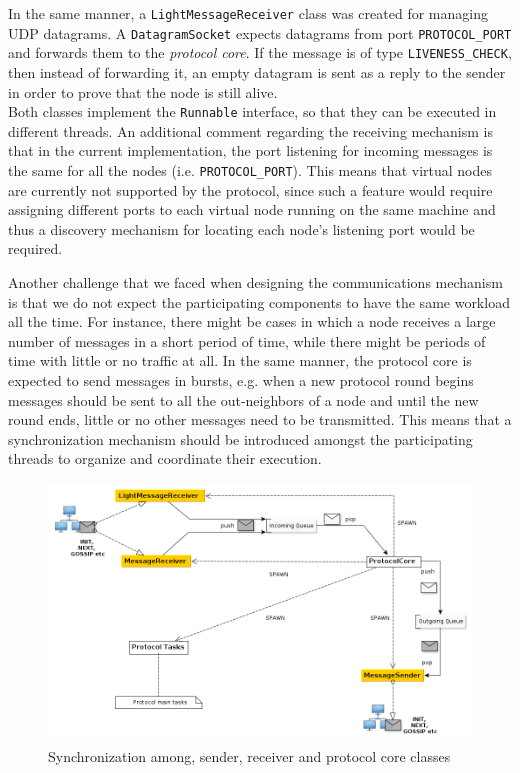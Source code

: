 \documentclass[a4paper,11pt,twoside]{report}
\newcommand{\classname}[1]{\texttt{#1}}
\begin{document}
\begin{description}
In the same manner, a \classname{LightMessageReceiver} class was created for managing UDP datagrams. A \classname{DatagramSocket} expects datagrams from port \classname{PROTOCOL\_PORT} and forwards them to the \textit{protocol core}. If the message is of type \classname{LIVENESS\_CHECK}, then instead of forwarding it, an empty datagram is sent as a reply to the sender in order to prove that the node is still alive. \\

Both classes implement the \classname{Runnable} interface, so that they can be executed in different threads. An additional comment regarding the receiving mechanism is that in the current implementation, the port listening for incoming messages is the same for all the nodes (i.e. \classname{PROTOCOL\_PORT}). This means that virtual nodes are currently not supported by the protocol, since such a feature would require assigning different ports to each virtual node running on the same machine and thus a discovery mechanism for locating each node's listening port would be required.
\end{description}

Another challenge that we faced when designing the communications mechanism is that we do not expect the participating components to have the same workload all the time. For instance, there might be cases in which a node receives a large number of messages in a short period of time, while there might be periods of time with little or no traffic at all. In the same manner, the protocol core is expected to send messages in bursts, e.g. when a new protocol round begins messages should be sent to all the out-neighbors of a node and until the new round ends, little or no other messages need to be transmitted. This means that a synchronization mechanism should be introduced amongst the participating threads to organize and coordinate their execution.\\

\begin{figure}[h]
   \centering
    \includegraphics[scale=0.45]{../figures/communication_architecture.png}
     \caption{Synchronization among, sender, receiver and protocol core classes}
     \label{fig:communications_architecture}
\end{figure}
\end{document}
